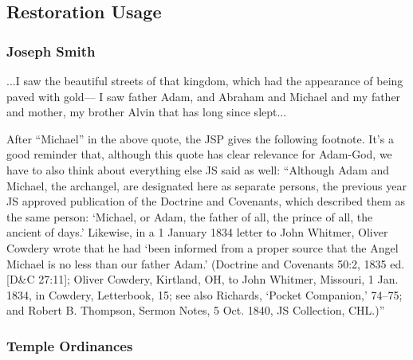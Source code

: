 
\subsection{Restoration Usage} %
	\label{ADAMGOD-RESTORATION}

	\subsubsection{Joseph Smith} %
		\label{ADAMGOD-JS}
	
		\begin{compactdesc}
			\item[{\hyperref[EMS-1836-JS-21-JAN-1836]{Visions, 21 January 1836 [D\&C 137]}}] ...I saw the beautiful streets of that kingdom, which had the appearance of being paved with gold--- I saw father Adam, and Abraham and Michael and my father and mother, my brother Alvin that has long since slept...
				\begin{compactitem}
					\item[Commentary] After ``Michael'' in the above quote, the JSP gives the following footnote. It's a good reminder that, although this quote has clear relevance for Adam-God, we have to also think about everything else JS said as well: ``Although Adam and Michael, the archangel, are designated here as separate persons, the previous year JS approved publication of the Doctrine and Covenants, which described them as the same person: `Michael, or Adam, the father of all, the prince of all, the ancient of days.' Likewise, in a 1 January 1834 letter to John Whitmer, Oliver Cowdery wrote that he had `been informed from a proper source that the Angel Michael is no less than our father Adam.' (Doctrine and Covenants 50:2, 1835 ed. [D\&C 27:11]; Oliver Cowdery, Kirtland, OH, to John Whitmer, Missouri, 1 Jan. 1834, in Cowdery, Letterbook, 15; see also Richards, `Pocket Companion,' 74--75; and Robert B. Thompson, Sermon Notes, 5 Oct. 1840, JS Collection, CHL.)''
				\end{compactitem}
		\end{compactdesc}
		
	\subsubsection{Temple Ordinances}
		\label{ADAMGOD-TEMPLE}
	
